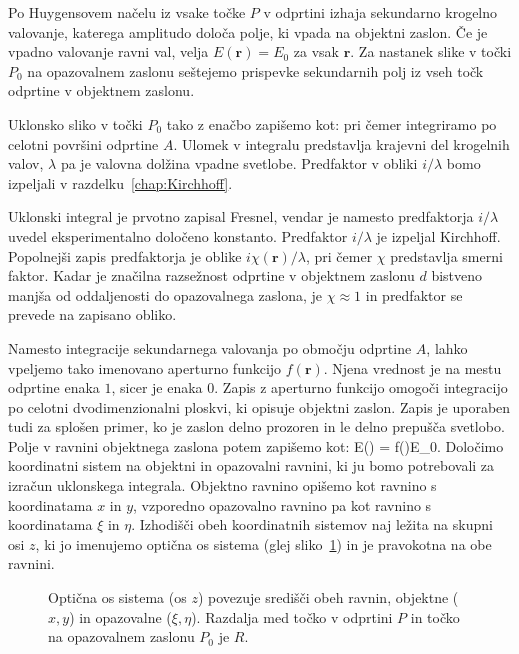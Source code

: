 Po Huygensovem načelu iz vsake točke $P$ v odprtini izhaja sekundarno krogelno valovanje, 
katerega amplitudo določa polje, ki vpada na objektni zaslon. Če je vpadno valovanje
ravni val, velja $E(\mathbf{r}) = E_0$ za vsak $\mathbf{r}$. Za nastanek slike
v točki $P_0$  na opazovalnem zaslonu seštejemo prispevke sekundarnih
polj iz vseh točk odprtine v objektnem zaslonu. 

Uklonsko sliko v točki $P_0$ tako z enačbo zapišemo kot:
pri čemer integriramo po celotni površini odprtine $A$. Ulomek v integralu predstavlja
krajevni del krogelnih valov, $\lambda$ pa je valovna dolžina vpadne svetlobe. Predfaktor
v obliki $i/\lambda$ bomo izpeljali v razdelku~\ref{chap:Kirchhoff}.
\begin{remark}
Uklonski integral je prvotno zapisal Fresnel, vendar je namesto predfaktorja 
$i/\lambda$ uvedel eksperimentalno določeno konstanto. Predfaktor $i/\lambda$ je 
izpeljal Kirchhoff. Popolnejši zapis predfaktorja je oblike $i \chi(\mathbf{r})/\lambda$,
pri čemer $\chi$ predstavlja smerni faktor. Kadar je značilna razsežnost odprtine v 
objektnem zaslonu $d$ bistveno manjša od oddaljenosti do opazovalnega zaslona, 
je $\chi \approx 1$ in predfaktor se prevede na zapisano obliko. 
\end{remark}

Namesto integracije sekundarnega valovanja po območju odprtine $A$, lahko vpeljemo
tako imenovano aperturno funkcijo $f(\mathbf{r})$. Njena vrednost je na mestu odprtine enaka $1$,
sicer je enaka $0$. Zapis z aperturno funkcijo omogoči integracijo po celotni dvodimenzionalni
ploskvi, ki opisuje objektni zaslon. Zapis je uporaben tudi za splošen primer, ko je zaslon
delno prozoren in le delno prepušča svetlobo. Polje v ravnini objektnega zaslona potem zapišemo kot:
\beq
E() = f()E_0.
\label{eq:05_02}
\eeq
Določimo koordinatni sistem na objektni in opazovalni ravnini, ki ju bomo potrebovali
za izračun uklonskega integrala. Objektno ravnino
opišemo kot ravnino s koordinatama $x$ in $y$, vzporedno opazovalno ravnino pa kot ravnino
s koordinatama $\xi$ in $\eta$. Izhodišči obeh koordinatnih sistemov naj ležita 
na skupni osi $z$, ki jo imenujemo optična os sistema (glej sliko~\ref{fig:05_koordinate})
in je pravokotna na obe ravnini.
\begin{figure}[ht]
\centering
\def\svgwidth{120truemm} 

\caption{Optična os sistema (os $z$) povezuje središči obeh ravnin, objektne ($x,y$) in 
opazovalne ($\xi, \eta$). Razdalja med točko v odprtini $P$ in točko na opazovalnem zaslonu $P_0$
je $R$.}
\label{fig:05_koordinate}
\end{figure}

